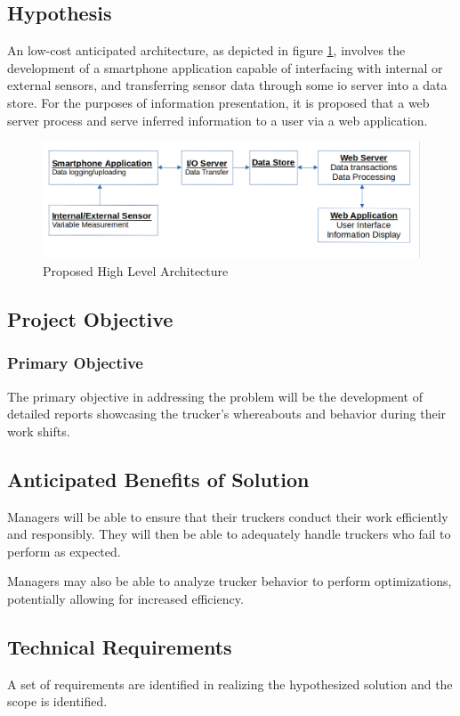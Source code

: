 \subsection{Hypothesis}
An low-cost anticipated architecture, as depicted in figure \ref{fig:high_arch}, involves the development of a smartphone application capable of interfacing with internal or external sensors, and transferring sensor data through some \ac{io} server into a data store. \cite{bertocco1998client}
For the purposes of information presentation, it is proposed that a web server process and serve inferred information to a user via a web application.
\begin{figure}[H]
    \centering
    \includegraphics[scale=0.45]{high_arch.png}
    \caption{Proposed High Level Architecture}
    \label{fig:high_arch}
\end{figure}

\subsection{Project Objective}
\subsubsection{Primary Objective}
The primary objective in addressing the problem will be the development of detailed reports showcasing the trucker's whereabouts and behavior during their work shifts.

\subsection{Anticipated Benefits of Solution}
Managers will be able to ensure that their truckers conduct their work efficiently and responsibly.
They will then be able to adequately handle truckers who fail to perform as expected.

Managers may also be able to analyze trucker behavior to perform optimizations, potentially allowing for increased efficiency.

\subsection{Technical Requirements}
A set of requirements are identified in realizing the hypothesized solution and the scope is identified. 

